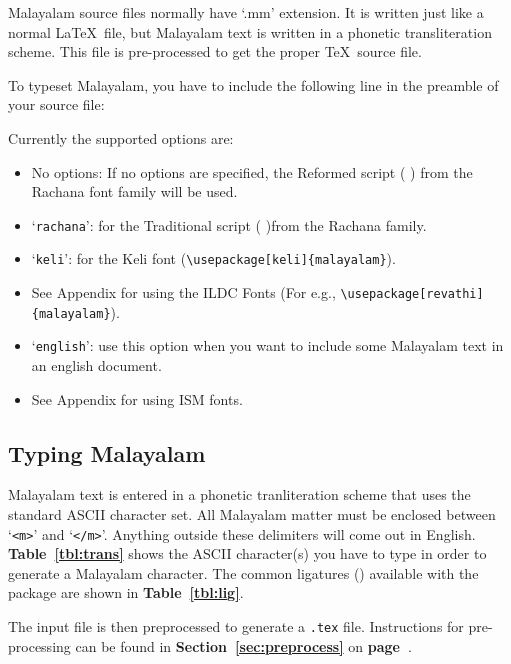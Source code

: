 \documentclass[12pt]{article}
\begin{document}
{Malayalam source files normally have `.mm' extension.
It is written just like a normal \LaTeX\ file, but
Malayalam text is written in a phonetic transliteration scheme.
This file is pre-processed to get the proper \TeX\ source file.

To typeset Malayalam, you have to include the
following line in the preamble of your source file:


\noindent Currently the supported options are:

\begin{itemize}
\item No options: If no options are specified, the Reformed script
({\mm \-\-\- \-\-}) from the Rachana font family
will be used.
\item `{\tt rachana}': for the Traditional script
({\mm \-\-\- \-\-})from the Rachana family.
\item `{\tt keli}': for the Keli font (\verb"\usepackage[keli]{malayalam}").
\item See Appendix for using the ILDC Fonts (For e.g., \verb"\usepackage[revathi]{malayalam}").
\item `{\tt english}': use this option when you want to include
some Malayalam text in an english document.
\item See Appendix for using ISM fonts.
\end{itemize}

\subsection{Typing Malayalam}

Malayalam text is entered in a phonetic tranliteration scheme
that uses the standard ASCII character set. All Malayalam
matter must be enclosed between `{\tt <m{}>}' and
`{\tt </m{}>}'. Anything outside these delimiters will come out
in English. {\bf Table~\ref{tbl:trans}} shows the ASCII character(s)
you have to type in order to generate a Malayalam character.
The common ligatures ({\mm \-\-\-\-\-\-}) available with
the package are shown in {\bf Table~\ref{tbl:lig}}.

The input file is then preprocessed to generate a {\tt .tex} file.
Instructions for pre-processing can be found in
{\bf Section~\ref{sec:preprocess}} on
{\bf page~\pageref{sec:preprocess}}.

}
\end{document}
